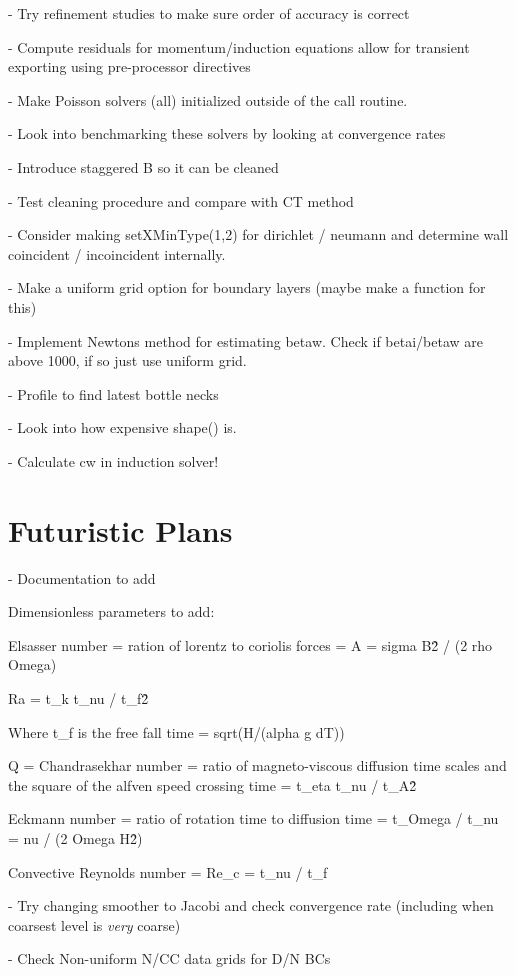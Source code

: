 \documentclass[11pt]{article}
\begin{document}
- Try refinement studies to make sure order of accuracy is correct

- Compute residuals for momentum/induction equations allow for transient exporting using pre-processor directives

- Make Poisson solvers (all) initialized outside of the call routine.

- Look into benchmarking these solvers by looking at convergence rates

- Introduce staggered B so it can be cleaned

- Test cleaning procedure and compare with CT method

- Consider making setXMinType(1,2) for dirichlet / neumann and determine wall coincident / incoincident internally.

- Make a uniform grid option for boundary layers (maybe make a function for this)

- Implement Newtons method for estimating betaw. Check if betai/betaw
are above 1000, if so just use uniform grid.

- Profile to find latest bottle necks

- Look into how expensive shape() is.

- Calculate cw in induction solver!

\section{Futuristic Plans}

- Documentation to add

Dimensionless parameters to add:

Elsasser number = ration of lorentz to coriolis forces = A = sigma B\^2 / (2 rho Omega)

Ra = t\_k t\_nu / t\_f\^2

Where t\_f is the free fall time = sqrt(H/(alpha g dT))

Q = Chandrasekhar number = ratio of magneto-viscous diffusion time scales and the square of the alfven speed crossing time
 = t\_eta t\_nu / t\_A\^2

Eckmann number = ratio of rotation time to diffusion time
 = t\_Omega / t\_nu = nu / (2 Omega H\^2)


Convective Reynolds number = Re\_c = t\_nu / t\_f

- Try changing smoother to Jacobi and check convergence rate (including when coarsest level is \textit{very} coarse)

- Check Non-uniform N/CC data grids for D/N BCs
\end{document}
